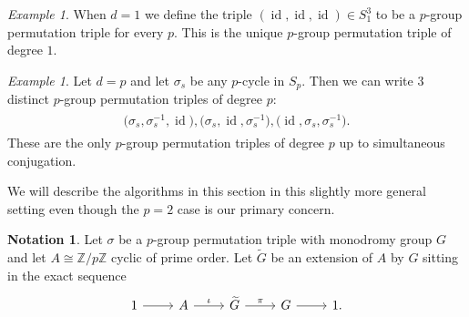 \documentclass{dcthesis}
\newcommand{\ZZ}{\mathbb Z}
\newcommand{\wt}[1]{\widetilde{#1}}
\DeclareMathOperator{\id}{id}
\numberwithin{equation}{section}
\newtheorem{lemma}[equation]{Lemma}
\theoremstyle{definition}
\newtheorem{notation}[equation]{Notation}
\theoremstyle{remark}
\newtheorem{example}[equation]{Example}
\begin{document}
{{{    %
    \begin{example}
      \label{exm:degree1belyitriple}
      When $d=1$ we define the triple
      $(\id,\id,\id)\in S_1^3$ to be a $p$-group
      permutation triple for every $p$.
      This is the unique $p$-group permutation
      triple of degree $1$.
    \end{example}
    \begin{example}
      \label{exm:degreepbelyitriple}
      Let $d=p$ and let $\sigma_s$ be
      any $p$-cycle in $S_p$.
      Then we can write $3$ distinct
      $p$-group permutation triples
      of degree $p$:
      \begin{align}
        \label{eqn:dequalsp}
        \begin{split}
          \Big(\sigma_s,\sigma_s^{-1},\id\Big),
          \Big(\sigma_s,\id,\sigma_s^{-1}\Big),
          \Big(\id,\sigma_s,\sigma_s^{-1}\Big).
        \end{split}
      \end{align}
      These are the only $p$-group permutation
      triples
      of degree $p$ up to
      simultaneous conjugation.
    \end{example}
    We will describe the algorithms in this
    section in this slightly more general setting
    even though the $p=2$ case is our primary
    concern.
    \begin{notation}
      \label{not:oursetting}
      Let $\sigma$ be a $p$-group permutation
      triple
      with monodromy group $G$
      and
      let $A\cong\ZZ/p\ZZ$
      cyclic of prime order.
      Let $\wt{G}$ be an extension of $A$
      by $G$ sitting in the exact sequence
      \begin{equation}
        \label{eqn:motivateliftdefinition}
        \begin{tikzcd}
          1\arrow{r}&A\arrow{r}{\iota}
                    &\wt{G}\arrow{r}{\pi}
                    &G\arrow{r}
                    &1.
        \end{tikzcd}
      \end{equation}

\end{notation}}}}
\end{document}
